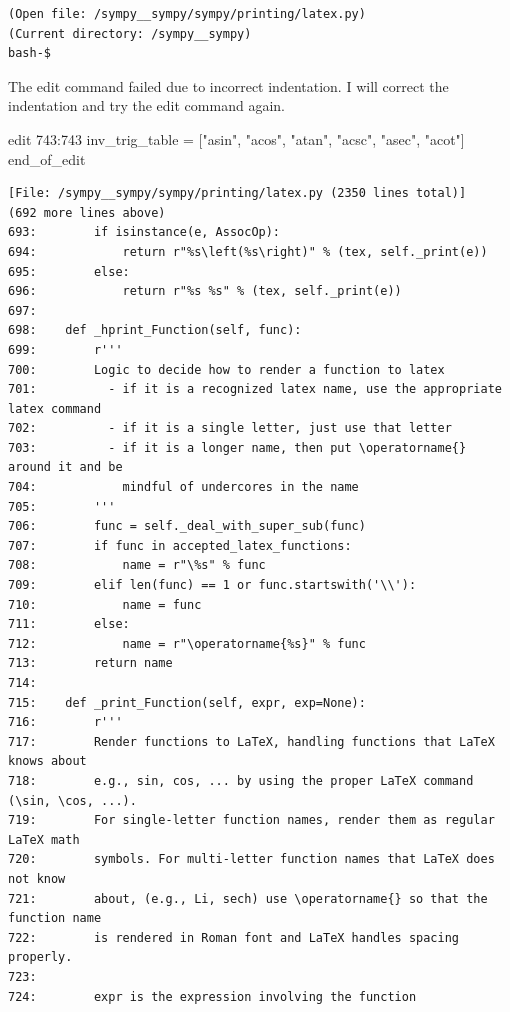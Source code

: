 {\begin{observationbox}
\begin{Verbatim}[breaklines=true, breakanywhere=true]
(Open file: /sympy__sympy/sympy/printing/latex.py)
(Current directory: /sympy__sympy)
bash-$
\end{Verbatim}
\end{observationbox}
\begin{agentbox}
The edit command failed due to incorrect indentation. I will correct the indentation and try the edit command again.



\hrulefill
\begin{CodeVerbatim}[breaklines=true, breakanywhere=true]
edit 743:743
            inv_trig_table = ["asin", "acos", "atan", "acsc", "asec", "acot"]
end_of_edit
\end{CodeVerbatim}
\end{agentbox}
\begin{observationbox}\begin{Verbatim}[breaklines=true, breakanywhere=true]
[File: /sympy__sympy/sympy/printing/latex.py (2350 lines total)]
(692 more lines above)
693:        if isinstance(e, AssocOp):
694:            return r"%s\left(%s\right)" % (tex, self._print(e))
695:        else:
696:            return r"%s %s" % (tex, self._print(e))
697:
698:    def _hprint_Function(self, func):
699:        r'''
700:        Logic to decide how to render a function to latex
701:          - if it is a recognized latex name, use the appropriate latex command
702:          - if it is a single letter, just use that letter
703:          - if it is a longer name, then put \operatorname{} around it and be
704:            mindful of undercores in the name
705:        '''
706:        func = self._deal_with_super_sub(func)
707:        if func in accepted_latex_functions:
708:            name = r"\%s" % func
709:        elif len(func) == 1 or func.startswith('\\'):
710:            name = func
711:        else:
712:            name = r"\operatorname{%s}" % func
713:        return name
714:
715:    def _print_Function(self, expr, exp=None):
716:        r'''
717:        Render functions to LaTeX, handling functions that LaTeX knows about
718:        e.g., sin, cos, ... by using the proper LaTeX command (\sin, \cos, ...).
719:        For single-letter function names, render them as regular LaTeX math
720:        symbols. For multi-letter function names that LaTeX does not know
721:        about, (e.g., Li, sech) use \operatorname{} so that the function name
722:        is rendered in Roman font and LaTeX handles spacing properly.
723:
724:        expr is the expression involving the function

\end{Verbatim}
\end{observationbox}}
